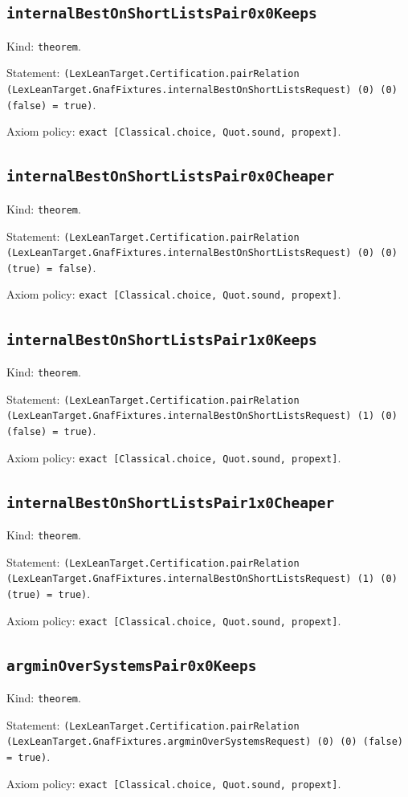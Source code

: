\documentclass[11pt]{article}
\begin{document}
\subsection*{\texttt{internalBestOnShortListsPair0x0Keeps}}
\noindent Kind: \texttt{theorem}.\par
\noindent Statement: \texttt{(LexLeanTarget.Certification.pairRelation (LexLeanTarget.GnafFixtures.internalBestOnShortListsRequest) (0) (0) (false) = true)}.\par
\noindent Axiom policy: \texttt{exact [Classical.choice, Quot.sound, propext]}.\par
\subsection*{\texttt{internalBestOnShortListsPair0x0Cheaper}}
\noindent Kind: \texttt{theorem}.\par
\noindent Statement: \texttt{(LexLeanTarget.Certification.pairRelation (LexLeanTarget.GnafFixtures.internalBestOnShortListsRequest) (0) (0) (true) = false)}.\par
\noindent Axiom policy: \texttt{exact [Classical.choice, Quot.sound, propext]}.\par
\subsection*{\texttt{internalBestOnShortListsPair1x0Keeps}}
\noindent Kind: \texttt{theorem}.\par
\noindent Statement: \texttt{(LexLeanTarget.Certification.pairRelation (LexLeanTarget.GnafFixtures.internalBestOnShortListsRequest) (1) (0) (false) = true)}.\par
\noindent Axiom policy: \texttt{exact [Classical.choice, Quot.sound, propext]}.\par
\subsection*{\texttt{internalBestOnShortListsPair1x0Cheaper}}
\noindent Kind: \texttt{theorem}.\par
\noindent Statement: \texttt{(LexLeanTarget.Certification.pairRelation (LexLeanTarget.GnafFixtures.internalBestOnShortListsRequest) (1) (0) (true) = true)}.\par
\noindent Axiom policy: \texttt{exact [Classical.choice, Quot.sound, propext]}.\par
\subsection*{\texttt{argminOverSystemsPair0x0Keeps}}
\noindent Kind: \texttt{theorem}.\par
\noindent Statement: \texttt{(LexLeanTarget.Certification.pairRelation (LexLeanTarget.GnafFixtures.argminOverSystemsRequest) (0) (0) (false) = true)}.\par
\noindent Axiom policy: \texttt{exact [Classical.choice, Quot.sound, propext]}.\par
\end{document}
